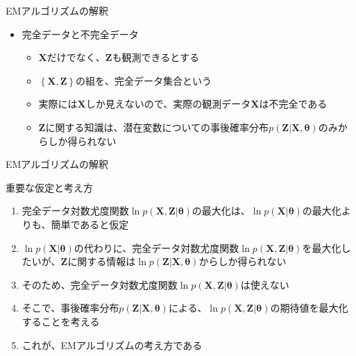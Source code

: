 \documentclass[dvipdfmx,notheorems,t]{beamer}
\begin{document}
\begin{frame}{EMアルゴリズムの解釈}
\begin{itemize}
	\framebreak
	
	\item 完全データと不完全データ
	\begin{itemize}
		\item $\bm{X}$だけでなく、$\bm{Z}$も観測できるとする
		\item $\left\{ \bm{X}, \bm{Z} \right\}$の組を、\alert{完全データ集合}という
		\item 実際には$\bm{X}$しか見えないので、実際の観測データ$\bm{X}$は\alert{不完全}である
		\newline
		\item $\bm{Z}$に関する知識は、潜在変数についての事後確率分布$p(\bm{Z} | \bm{X}, \bm{\theta})$\alert{のみ}からしか得られない
	\end{itemize}
\end{itemize}

\end{frame}

\begin{frame}{EMアルゴリズムの解釈}

\begin{block}{重要な仮定と考え方}
	\begin{enumerate}
		\item 完全データ対数尤度関数$\ln p(\bm{X}, \bm{Z} | \bm{\theta})$の最大化は、\color{red}$\ln p(\bm{X} | \bm{\theta})$の最大化よりも、簡単\normalcolor であると仮定
		\newline
		\item $\ln p(\bm{X} | \bm{\theta})$の代わりに、完全データ対数尤度関数$\ln p(\bm{X}, \bm{Z} | \bm{\theta})$を\color{red}最大化したい\normalcolor が、$\bm{Z}$に関する情報は$\ln p(\bm{Z} | \bm{X}, \bm{\theta})$からしか得られない
		\newline
		\item そのため、完全データ対数尤度関数$\ln p(\bm{X}, \bm{Z} | \bm{\theta})$は使えない
		\newline
		\item そこで、事後確率分布$p(\bm{Z} | \bm{X}, \bm{\theta})$による、$\ln p(\bm{X}, \bm{Z} | \bm{\theta})$の\color{red}期待値を最大化\normalcolor することを考える
		\newline
		\item これが、EMアルゴリズムの考え方である
	\end{enumerate}
\end{block}

\end{frame}
\end{document}
